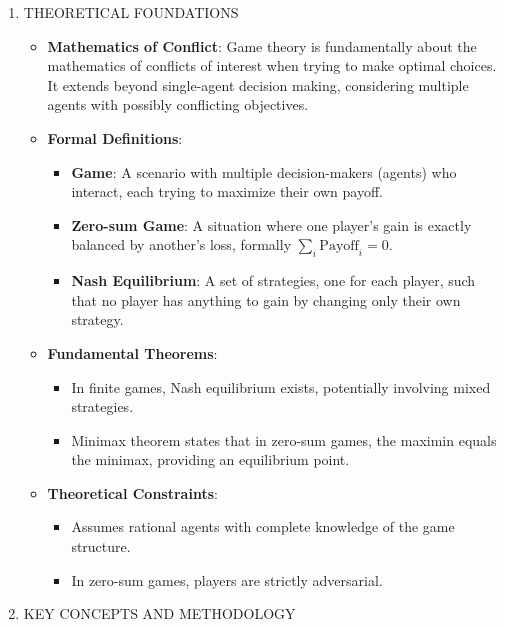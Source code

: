 \documentclass[
  12pt,
]{report}
\providecommand{\tightlist}{%
  \setlength{\itemsep}{0pt}\setlength{\parskip}{0pt}}
\begin{document}
\begin{enumerate}
\def\labelenumi{\arabic{enumi}.}
\item
  THEORETICAL FOUNDATIONS

  \begin{itemize}
  \item
    \textbf{Mathematics of Conflict}: Game theory is fundamentally about the mathematics of conflicts of interest when trying to make optimal choices. It extends beyond single-agent decision making, considering multiple agents with possibly conflicting objectives.
  \item
    \textbf{Formal Definitions}:

    \begin{itemize}
    \tightlist
    \item
      \textbf{Game}: A scenario with multiple decision-makers (agents) who interact, each trying to maximize their own payoff.
    \item
      \textbf{Zero-sum Game}: A situation where one player's gain is exactly balanced by another's loss, formally \(\sum_{i} \text{Payoff}_i = 0\).
    \item
      \textbf{Nash Equilibrium}: A set of strategies, one for each player, such that no player has anything to gain by changing only their own strategy.
    \end{itemize}
  \item
    \textbf{Fundamental Theorems}:

    \begin{itemize}
    \tightlist
    \item
      In finite games, Nash equilibrium exists, potentially involving mixed strategies.
    \item
      Minimax theorem states that in zero-sum games, the maximin equals the minimax, providing an equilibrium point.
    \end{itemize}
  \item
    \textbf{Theoretical Constraints}:

    \begin{itemize}
    \tightlist
    \item
      Assumes rational agents with complete knowledge of the game structure.
    \item
      In zero-sum games, players are strictly adversarial.
    \end{itemize}
  \end{itemize}
\item
  KEY CONCEPTS AND METHODOLOGY


\end{enumerate}
\end{document}
